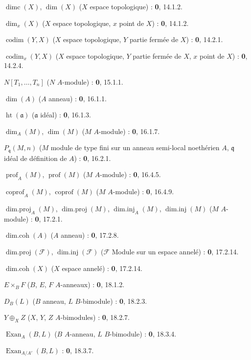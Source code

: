 $\operatorname{dimc}(X)$, $\dim(X)$ ($X$ espace topologique) : \textbf{0}, 14.1.2.\par
$\dim_x(X)$ ($X$ espace topologique, $x$ point de $X$) : \textbf{0}, 14.1.2.\par
$\operatorname{codim}(Y,X)$ ($X$ espace topologique, $Y$ partie fermée de $X$) : \textbf{0}, 14.2.1.\par
$\operatorname{codim}_x(Y,X)$ ($X$ espace topologique, $Y$ partie fermée de $X$, $x$ point de $X$) : \textbf{0}, 14.2.4.\par
$N[T_1,\ldots,T_n]$ ($N$ $A$-module) : \textbf{0}, 15.1.1.\par
$\dim(A)$ ($A$ anneau) : \textbf{0}, 16.1.1.\par
$\operatorname{ht}(\mathfrak a)$ ($\mathfrak a$ idéal) : \textbf{0}, 16.1.3.\par
$\dim_A(M)$, $\dim(M)$ ($M$ $A$-module) : \textbf{0}, 16.1.7.\par
$P_{\mathfrak q}(M,n)$ ($M$ module de type fini sur un anneau semi-local noethérien $A$, $\mathfrak q$ idéal de définition de $A$) : \textbf{0}, 16.2.1.\par
$\operatorname{prof}_A(M)$, $\operatorname{prof}(M)$ ($M$ $A$-module) : \textbf{0}, 16.4.5.\par
$\operatorname{coprof}_A(M)$, $\operatorname{coprof}(M)$ ($M$ $A$-module) : \textbf{0}, 16.4.9.\par
$\operatorname{dim.proj}_A(M)$, $\operatorname{dim.proj}(M)$,
$\operatorname{dim.inj}_A(M)$, $\operatorname{dim.inj}(M)$ ($M$ $A$-module) : \textbf{0}, 17.2.1.\par
$\operatorname{dim.coh}(A)$ ($A$ anneau) : \textbf{0}, 17.2.8.\par
$\operatorname{dim.proj}(\mathscr F)$, $\operatorname{dim.inj}(\mathscr F)$
($\mathscr F$ Module sur un espace annelé) : \textbf{0}, 17.2.14.\par
$\operatorname{dim.coh}(X)$ ($X$ espace annelé) : \textbf{0}, 17.2.14.\par
$E\times_B F$ ($B$, $E$, $F$ $A$-anneaux) : \textbf{0}, 18.1.2.\par
$D_B(L)$ ($B$ anneau, $L$ $B$-bimodule) : \textbf{0}, 18.2.3.\par
$Y\oplus_X Z$ ($X$, $Y$, $Z$ $A$-bimodules) : \textbf{0}, 18.2.7.\par
$\operatorname{Exan}_A(B,L)$ ($B$ $A$-anneau, $L$ $B$-bimodule) : \textbf{0}, 18.3.4.\par
$\operatorname{Exan}_{A/A'}(B,L)$ : \textbf{0}, 18.3.7.\par
